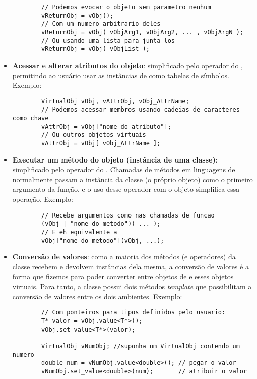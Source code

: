 \begin{itemize}
\begin{lstlisting}
        // Podemos evocar o objeto sem parametro nenhum
        vReturnObj = vObj();
        // Com um numero arbitrario deles
        vReturnObj = vObj( vObjArg1, vObjArg2, ... , vObjArgN );
        // Ou usando uma lista para junta-los
        vReturnObj = vObj( vObjList );
      \end{lstlisting}
    \item \textbf{Acessar e alterar atributos do objeto}: simplificado pelo operador
      \lang{[]} do \CXX{}, permitindo ao usuário usar as instâncias de \VObj{} como
      tabelas de símbolos. Exemplo:
      \vspace{1em}
      \begin{lstlisting}
        VirtualObj vObj, vAttrObj, vObj_AttrName;
        // Podemos acessar membros usando cadeias de caracteres como chave
        vAttrObj = vObj["nome_do_atributo"];
        // Ou outros objetos virtuais
        vAttrObj = vObj[ vObj_AttrName ];
      \end{lstlisting}
    \item \textbf{Executar um método do objeto (instância de uma classe)}: simplificado pelo
      operador \lang{|} do \CXX{}. Chamadas de métodos em linguagens de \script{} normalmente
      passam a instância da classe (o próprio objeto) como o primeiro argumento da
      função, e o uso desse operador com o objeto simplifica essa operação. Exemplo: 
      \vspace{1em}
      \begin{lstlisting}
        // Recebe argumentos como nas chamadas de funcao
        (vObj | "nome_do_metodo")( ... );
        // E eh equivalente a
        vObj["nome_do_metodo"](vObj, ...);
      \end{lstlisting}
    \item \textbf{Conversão de valores}: como a maioria dos métodos (e operadores) da classe
      \VObj{} recebem e devolvem instâncias dela mesma, a conversão de valores é a forma que
      fizemos para poder converter entre objetos de \CXX{} e esses objetos virtuais. Para
      tanto, a classe possui dois métodos \textit{template}\footnotemark{} que possibilitam
      a conversão de valores entre os dois ambientes. Exemplo:
      \vspace{0.5em}
      \begin{lstlisting}
        // Com ponteiros para tipos definidos pelo usuario:
        T* valor = vObj.value<T*>();
        vObj.set_value<T*>(valor);
        
        VirtualObj vNumObj; //suponha um VirtualObj contendo um numero
        double num = vNumObj.value<double>(); // pegar o valor
        vNumObj.set_value<double>(num);       // atribuir o valor
      \end{lstlisting}
  \end{itemize}

